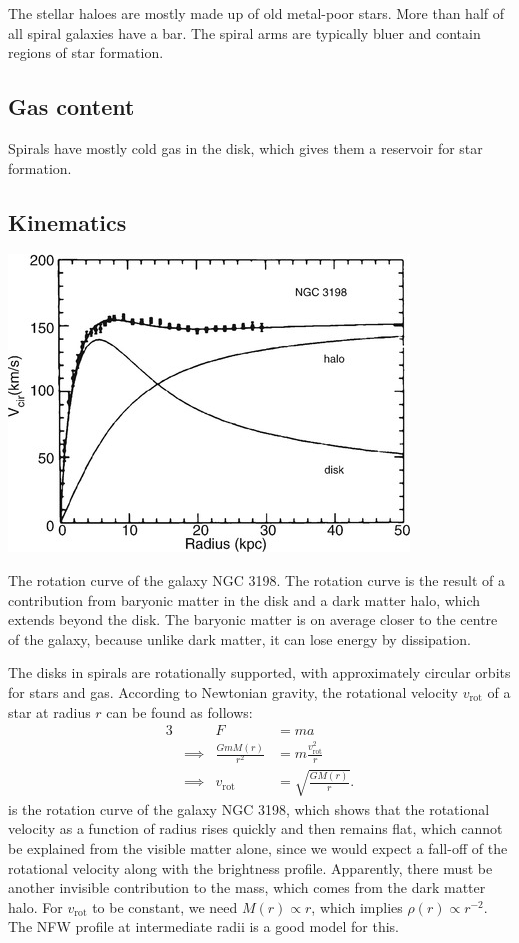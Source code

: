 The stellar haloes are mostly made up of old metal-poor stars.
More than half of all spiral galaxies have a bar.
The spiral arms are typically bluer and contain regions of star formation.

\subsection{Gas content}
Spirals have mostly cold gas in the disk, which gives them a reservoir for star formation.

\subsection{Kinematics}
\begin{marginfigure}
	\includegraphics[width=\textwidth]{img/ch-05/rotation-curve.png}
	\caption{The rotation curve of the galaxy NGC 3198. The rotation curve is the result of a contribution from baryonic matter in the disk and a dark matter halo, which extends beyond the disk. The baryonic matter is on average closer to the centre of the galaxy, because unlike dark matter, it can lose energy by dissipation.}
	\label{fig:rotation-curve}
\end{marginfigure}
The disks in spirals are rotationally supported, with approximately circular orbits for stars and gas.
According to Newtonian gravity, the rotational velocity $v_\text{rot}$ of a star at radius $r$ can be found as follows:
\begin{alignat*}{3}
	         && F &= ma\\
	&\implies & \frac{G m M(r)}{r^2} &= m \frac{v_\text{rot}^2}{r}\\
	&\implies & v_\text{rot} &= \sqrt{\frac{G M(r)}{r}}.
\end{alignat*}
 is the rotation curve of the galaxy NGC 3198, which shows that the rotational velocity as a function of radius rises quickly and then remains flat, which cannot be explained from the visible matter alone, since we would expect a fall-off of the rotational velocity along with the brightness profile.
Apparently, there must be another invisible contribution to the mass, which comes from the dark matter halo.
For $v_\text{rot}$ to be constant, we need $M(r) \propto r$, which implies $\rho(r) \propto r^{-2}$.
The NFW profile at intermediate radii is a good model for this.

